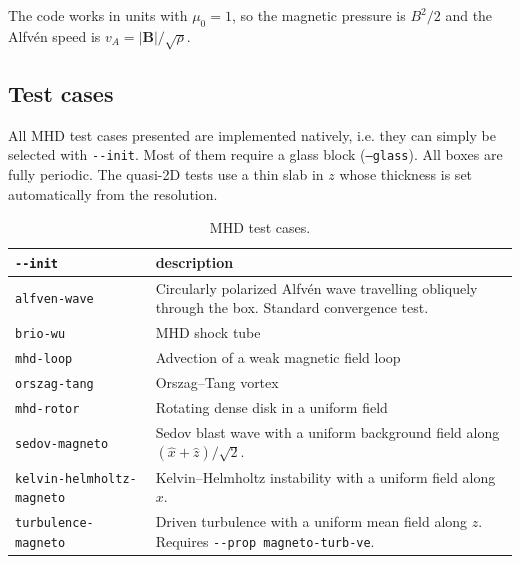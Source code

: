 The code works in units with $\mu_0 = 1$, so the magnetic pressure is $B^2/2$ and the Alfv\'en speed is $v_A = |\mathbf{B}|/\sqrt{\rho}$.


\subsection{Test cases}

All MHD test cases presented are implemented natively, i.e. they can simply be selected with \texttt{-{}-init}. Most of them require a glass block (\texttt{--glass}). All boxes are fully periodic. The quasi-2D tests use a thin slab in $z$ whose thickness is set automatically from the resolution.

\begin{table}[htbp]
\setlength{\abovecaptionskip}{6pt}%
\centering
\small
\setlength{\tabcolsep}{4pt}
\begin{tabularx}{\linewidth}{@{}lX@{}}
\toprule
\texttt{-{}-init} & description \\
\midrule
\texttt{alfven-wave}              & Circularly polarized Alfv\'en wave travelling obliquely through the box. Standard convergence test. \\
\texttt{brio-wu}                  & MHD shock tube \\
\texttt{mhd-loop}                 & Advection of a weak magnetic field loop \\
\texttt{orszag-tang}              & Orszag--Tang vortex \\
\texttt{mhd-rotor}                & Rotating dense disk in a uniform field \\
\texttt{sedov-magneto}            & Sedov blast wave with a uniform background field along $(\hat{x}+\hat{z})/\sqrt{2}$. \\
\texttt{kelvin-helmholtz-magneto} & Kelvin--Helmholtz instability with a uniform field along $x$. \\
\texttt{turbulence-magneto}       & Driven turbulence with a uniform mean field along $z$. Requires \texttt{-{}-prop magneto-turb-ve}. \\
\bottomrule
\end{tabularx}
\caption{MHD test cases.}
\end{table}

